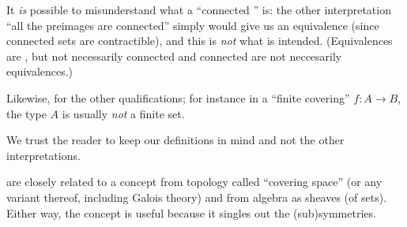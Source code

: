 \begin{remark}
  It \emph{is} possible to misunderstand what a ``connected \covering'' is: 
the other interpretation ``all the preimages are connected'' simply 
would give us an equivalence (since connected sets are contractible),
and this is \emph{not} what is intended. (Equivalences are \coverings, but not necessarily connected \coverings and connected \coverings are not neccesarily equivalences.)  

Likewise, for the other qualifications; for instance in a ``finite covering'' $f:A\to B$, the type $A$ is usually \emph{not} a finite set. 

  We trust the reader to keep our definitions in mind and not the other interpretations.
\end{remark}


\begin{remark}
  \Coverings are closely related to a concept from topology called ``covering space'' (or any variant thereof, including Galois theory) and from algebra as sheaves (of sets).  Either way, the concept is useful because it singles out the (sub)symmetries.  
\end{remark}




